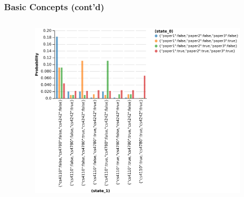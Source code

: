 \documentclass[usenames,dvipsnames]{beamer}
\begin{document}
\begin{frame}[fragile]
  \frametitle{Basic Concepts (cont'd)}
  \vspace{-1cm}
  \begin{columns}[t]
    \begin{column}{.6\textwidth}
      \inputminted[autogobble,fontsize=\fontsize{4.5}{4.5}\selectfont]{js}{src/model.wppl}
    \end{column}
    \begin{column}{.36\textwidth}
      \begin{figure}[ht]
        \centering
        \includegraphics[width=1\textwidth,height=0.6\textheight]{figures/model.png}
        \caption*{\label{fig:modeldist}}
      \end{figure}
    \end{column}
  \end{columns}
\end{frame}
\end{document}
